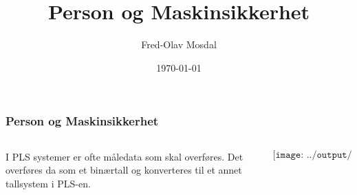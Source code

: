 \documentclass[aspectratio=169,xcolor=dvipsnames]{beamer}
\title[HMS]{Person og Maskinsikkerhet} %
\author[Fred-Olav] {Fred-Olav Mosdal}
\institute[Gand VGS] %
{
    Gand VGS \\
    VG3 Automasjon }
\date{\today} %
\begin{document}
\begin{frame}
\titlepage
\end{frame}


\begin{frame}
	\frametitle{Person og Maskinsikkerhet}
	\begin{columns}
		\begin{column}{0.5\textwidth}
I PLS systemer er ofte måledata som skal overføres. Det overføres da som et binærtall og konverteres til et annet tallsystem i PLS-en. 

			
		\end{column}

		\begin{column}{0.5\textwidth}
	$$\texttt{[image: ../output/noGPLimages/kap5x01]}$$
		\end{column}
	\end{columns}
\end{frame}
\end{document}
